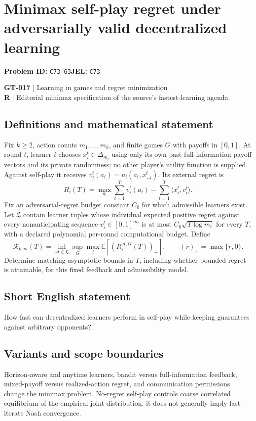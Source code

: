 \documentclass[11pt,a4paper]{article}
\begin{document}
\section*{Minimax self-play regret under adversarially valid decentralized learning}
\textbf{Problem ID:} \texttt{C73-63}\quad \textbf{JEL:} \texttt{C73}\par
\label{problem:OP-0147}
\label{game:GT-017}
{\sffamily\small\color{muted}
\textbf{GT-017} | Learning in games and regret minimization\\
\textbf{R} | Editorial minimax specification of the source's fastest-learning agenda.
\par}
\subsection*{Definitions and mathematical statement}
Fix $k\geq2$, action counts $m_1,\ldots,m_k$, and finite games $G$ with payoffs in $[0,1]$. At round $t$, learner $i$ chooses $x_i^t\in\Delta_{m_i}$ using only its own past full-information payoff vectors and its private randomness; no other player's utility function is supplied. Against self-play it receives $v_i^t(a_i)=u_i(a_i,x_{-i}^t)$. Its external regret is
\[
 R_i(T)=\max_{a_i}\sum_{t=1}^Tv_i^t(a_i)-
 \sum_{t=1}^T\langle x_i^t,v_i^t\rangle.
\]
Fix an adversarial-regret budget constant $C_0$ for which admissible learners exist. Let $\mathfrak L$ contain learner tuples whose individual expected positive regret against every nonanticipating sequence $v_i^t\in[0,1]^{m_i}$ is at most $C_0\sqrt{T\log m_i}$ for every $T$, with a declared polynomial per-round computational budget. Define
\[
 \mathcal R_{k,m}(T)=\inf_{\mathcal A\in\mathfrak L}\sup_G
 \max_i\mathbb E[(R_i^{\mathcal A,G}(T))_+],\qquad (r)_+=\max\{r,0\}.
\]
Determine matching asymptotic bounds in $T$, including whether bounded regret is attainable, for this fixed feedback and admissibility model.
\subsection*{Short English statement}
How fast can decentralized learners perform in self-play while keeping guarantees against arbitrary opponents?
\subsection*{Variants and scope boundaries}
Horizon-aware and anytime learners, bandit versus full-information feedback, mixed-payoff versus realized-action regret, and communication permissions change the minimax problem. No-regret self-play controls coarse correlated equilibrium of the empirical joint distribution; it does not generally imply last-iterate Nash convergence.
\end{document}
